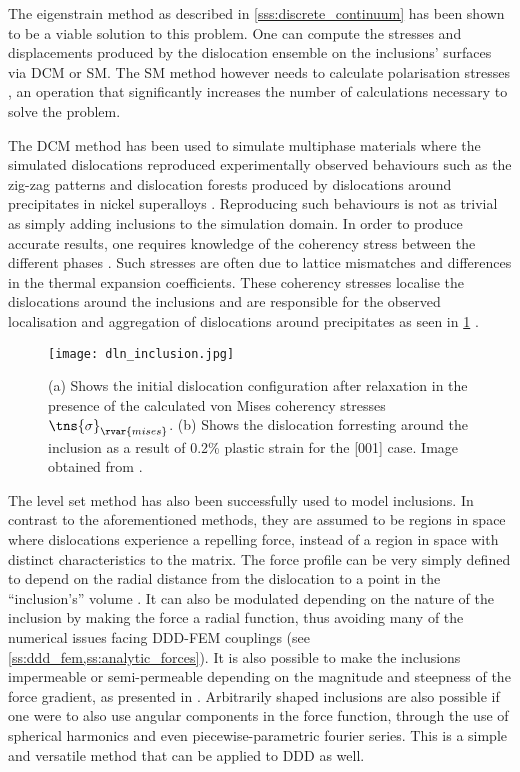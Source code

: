 The eigenstrain method \cite{eigenstrain_incl} as described in \cref{sss:discrete_continuum} has been shown to be a viable solution to this problem. One can compute the stresses and displacements produced by the dislocation ensemble on the inclusions' surfaces via DCM or SM. The SM method however needs to calculate polarisation stresses \cite{bdd}, an operation that significantly increases the number of calculations necessary to solve the problem.

The DCM method has been used to simulate multiphase materials where the simulated dislocations reproduced experimentally observed behaviours such as the zig-zag patterns and dislocation forests produced by dislocations around precipitates in nickel superalloys \cite{dcm0, dcm_incl}. Reproducing such behaviours is not as trivial as simply adding inclusions to the simulation domain. In order to produce accurate results, one requires knowledge of the coherency stress between the different phases \cite{dcm_incl}. Such stresses are often due to lattice mismatches and differences in the thermal expansion coefficients. These coherency stresses localise the dislocations around the inclusions and are responsible for the observed localisation and aggregation of dislocations around precipitates as seen in \cref{f:coherency} \cite{dcm_incl}.
\begin{figure}[t]
  \centering
  \texttt{[image: dln\_inclusion.jpg]}
  \caption[Modelling dislocation inclusion interactions with the discrete continuum model.]{(a) Shows the initial dislocation configuration after relaxation in the presence of the calculated von Mises coherency stresses $ \tns{\sigma}_{\rvar{mises}} $. (b) Shows the dislocation forresting around the inclusion as a result of 0.2\% plastic strain for the [001] case. Image obtained from \cite{dcm_incl}.}
  \label{f:coherency}
\end{figure}

The level set method has also been successfully used to model inclusions. In contrast to the aforementioned methods, they are assumed to be regions in space where dislocations experience a repelling force, instead of a region in space with distinct characteristics to the matrix. The force profile can be very simply defined to depend on the radial distance from the dislocation to a point in the ``inclusion's'' volume \cite{ddd_inclusion_as_force}. It can also be modulated depending on the nature of the inclusion by making the force a radial function, thus avoiding many of the numerical issues facing DDD-FEM couplings (see \cref{ss:ddd_fem,ss:analytic_forces}). It is also possible to make the inclusions impermeable or semi-permeable depending on the magnitude and steepness of the force gradient, as presented in \cite{ddd_inclusion_as_force}. Arbitrarily shaped inclusions are also possible if one were to also use angular components in the force function, through the use of spherical harmonics and even piecewise-parametric fourier series. This is a simple and versatile method that can be applied to DDD as well.

